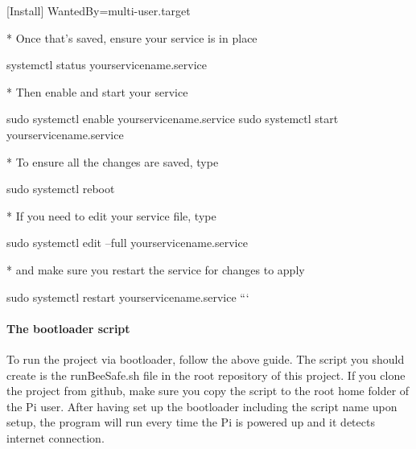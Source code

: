 \mbox{[}Install\mbox{]} Wanted\+By=multi-\/user.\+target 
\begin{DoxyCode}
* Once that's saved, ensure your service is in place
\end{DoxyCode}
 systemctl status yourservicename.\+service 
\begin{DoxyCode}
* Then enable and start your service
\end{DoxyCode}
 sudo systemctl enable yourservicename.\+service sudo systemctl start yourservicename.\+service 
\begin{DoxyCode}
* To ensure all the changes are saved, type
\end{DoxyCode}
 sudo systemctl reboot 
\begin{DoxyCode}
* If you need to edit your service file, type
\end{DoxyCode}
 sudo systemctl edit --full yourservicename.\+service 
\begin{DoxyCode}
* and make sure you restart the service for changes to apply
\end{DoxyCode}
 sudo systemctl restart yourservicename.\+service ```

\paragraph*{The bootloader script}

To run the project via bootloader, follow the above guide. The script you should create is the run\+Bee\+Safe.\+sh file in the root repository of this project. If you clone the project from github, make sure you copy the script to the root home folder of the Pi user. After having set up the bootloader including the script name upon setup, the program will run every time the Pi is powered up and it detects internet connection. 